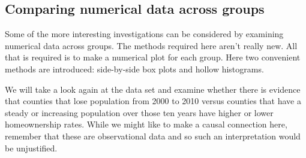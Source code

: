 
\subsection{Comparing numerical data across groups}
\label{comparingAcrossGroups}


Some of the more interesting investigations can be considered by examining numerical data across groups. The methods required here aren't really new. All that is required is to make a numerical plot for each group. Here two convenient methods are introduced: side-by-side box plots and hollow histograms.

We will take a look again at the  data set and examine whether there is evidence that counties that lose population from 2000 to 2010 versus counties that have a steady or increasing population over those ten years have higher or lower homeownership rates. While we might like to make a causal connection here, remember that these are observational data and so such an interpretation would be unjustified.


